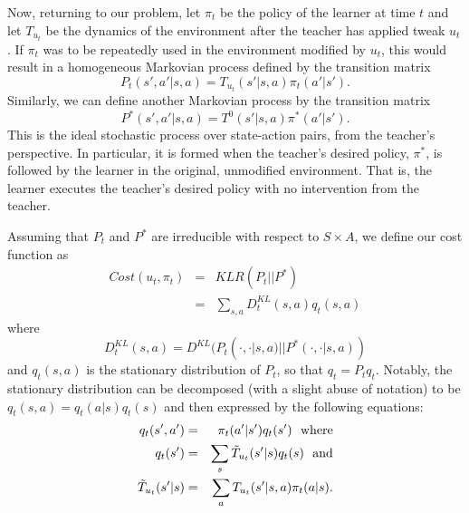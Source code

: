 Now, returning to our problem, let $\pi_t$ be the policy of the learner at time $t$ and let $T_{u_t}$ 
be the dynamics of the environment after the teacher has applied tweak $u_t$. If $\pi_t$ was to be 
repeatedly used in the environment modified by $u_t$, this would result in a homogeneous 
Markovian process defined by the transition matrix
\[
P_t(s',a'|s,a)=T_{u_t}(s'|s,a)\pi_t(a'|s').
\]
Similarly, we can define another  Markovian process by the transition matrix
\[
P^*(s',a'|s,a)=T^0(s'|s,a)\pi^*(a'|s').
\]
This is the ideal stochastic process over state-action pairs, from the teacher's perspective. In 
particular, it is formed when the teacher's desired policy, $\pi^*$, is followed by the learner in the 
original, unmodified environment. That is, the learner executes the teacher's desired policy with no 
intervention from the teacher.

Assuming that $P_t$ and $P^*$ are irreducible with respect to $S\times A$,  we define our cost function as
\begin{eqnarray*}
Cost(u_t,\pi_t) & =& KLR(P_t||P^*) \\
                           &=& \sum_{s,a}D^{KL}_t(s,a)q_t(s,a)
\end{eqnarray*}
where
\[
D_t^{KL}(s,a)=D^{KL}(P_t(\cdot,\cdot|s,a)||P^*(\cdot,\cdot|s,a))
\]
and $q_t(s,a)$ is the  stationary distribution of $P_t$, so that
$q_t=P_tq_t$. 
Notably, the
stationary distribution can be decomposed (with a slight abuse of
notation) to be $q_t(s,a)=q_t(a|s)q_t(s)$ and then expressed by the
following equations:
\begin{eqnarray*}
q_t(s',a')&=&\pi_t(a'|s')q_t(s')\ \ \mbox{where}\\
q_t(s')&=&\sum\limits_s\Tilde{T}_{u_t}(s'|s)q_t(s) \ \ \mbox{and}\\
\Tilde{T}_{u_t}(s'|s)&=&\sum_{a}T_{u_t}(s'|s,a)\pi_t(a|s).
\end{eqnarray*}



